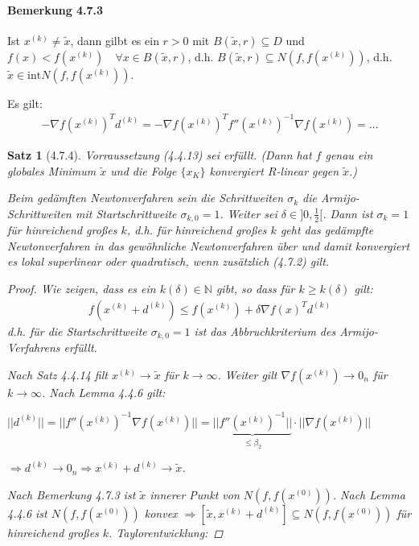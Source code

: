 \documentclass[ngerman,halfparskip]{scrartcl}
\newtheorem*{satz}{Satz}
\theoremstyle{definition}
\def\N{\mathbb N}
\begin{document}
\paragraph{Bemerkung 4.7.3} Ist $x^{(k)}\neq \tilde x$, dann gilbt es ein $r>0$ mit $B(\tilde x, r)\subseteq D$ und $f(x)<f(x^{(k)})\quad \forall x\in B(\tilde x, r)$, d.h. $B(\tilde x, r)\subseteq N(f,f(x^{(k)}))$, d.h. $\tilde x\in \text{int}N(f,f(x^{(k)}))$.

Es gilt:
\begin{gather*}\tag{4.7.3}
-\nabla f(x^{(k)})^Td^{(k)}=-\nabla f(x^{(k)})^T f''(x^{(k)})^{-1}\nabla f(x^{(k)})=...
\end{gather*}

\begin{satz}[4.7.4]
Vorraussetzung (4.4.13) sei erfüllt. (Dann hat $f$ genau ein globales Minimum $\tilde x$ und die Folge $\{x_K\}$ konvergiert $R$-linear gegen $\tilde x$.)

Beim gedämften Newtonverfahren sein die Schrittweiten $\sigma_k$ die Armijo-Schrittweiten mit Startschrittweite $\sigma_{k,0}=1$. Weiter sei $\delta\in]0,\frac 12[$. Dann ist $\sigma_k=1$ für hinreichend großes $k$, d.h. für hinreichend großes $k$ geht das gedämpfte Newtonverfahren in das gewöhnliche Newtonverfahren über und damit konvergiert es lokal superlinear oder quadratisch, wenn zusätzlich (4.7.2) gilt.

\begin{proof}
Wie zeigen, dass es ein $k(\delta)\in\N$ gibt, so dass für $k\geq k(\delta)$ gilt:
\begin{gather*}\tag{1}
f(x^{(k)}+d^{(k)})\leq f(x^{(k)})+\delta \nabla f(x)^Td^{(k)}
\end{gather*}
 d.h. für die Startschrittweite $\sigma_{k,0}=1$ ist das Abbruchkriterium des Armijo-Verfahrens erfüllt.
 
 Nach Satz 4.4.14 filt $x^{(k)}\rightarrow \tilde x$ für $k\rightarrow \infty$. Weiter gilt $\nabla f (x^{(k)})\rightarrow 0_n$ für $k\rightarrow \infty$. Nach Lemma  4.4.6 gilt:
 
 $||d^{(k)}||=||f''(x^{(k)})^{-1}\nabla f (x^{(k)})||=\underbrace{||f''(x^{(k)})^{-1}||}_{\leq \beta_2}\cdot ||\nabla f (x^{(k)})||$
 
 $\Rightarrow d^{(k)}\rightarrow 0_n \Rightarrow x^{(k)}+d^{(k)}\rightarrow \tilde x$.
 
 Nach Bemerkung 4.7.3 ist $\tilde x$ innerer Punkt von $N(f,f(x^{(0)}))$. Nach Lemma 4.4.6 ist $N(f,f(x^{(0)}))$ konvex $\Rightarrow [\tilde x,x^{(k)}+d^{(k)} ]\subseteq N(f,f(x^{(0)}))$ für hinreichend großes $k$. Taylorentwicklung:
 

\end{proof}
\end{satz}
\end{document}
